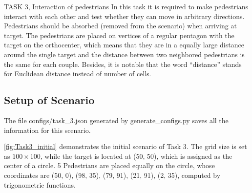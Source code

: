 \documentclass[10pt,a4paper]{article}
\begin{document}
\begin{task}{TASK 3, Interaction of pedestrians}
In this task it is required to make pedestrians interact with each other and test whether they can move in arbitrary directions. Pedestrians should be absorbed (removed from
the scenario) when arriving at target. The pedestrians are placed on vertices of a regular pentagon with the target on the orthocenter, which means that they are in a equally large distance around the single target and the distance between two neighbored pedestrians is the same for each couple. Besides, it is notable that the word ``distance'' stands for Euclidean distance instead of number of cells.

\subsection{Setup of Scenario}

The file configs/task\_3.json generated by generate\_configs.py saves all the information for this scenario. 

\autoref{fig:Task3_initial} demonstrates the initial scenario of Task 3. The grid size is set as $100 \times 100$, while the target is located at (50, 50), which is assigned as the center of a circle. 5 Pedestrians are placed equally on the circle, whose coordinates are (50, 0), (98, 35), (79, 91), (21, 91), (2, 35), computed by trigonometric functions.



\end{task}
\end{document}
